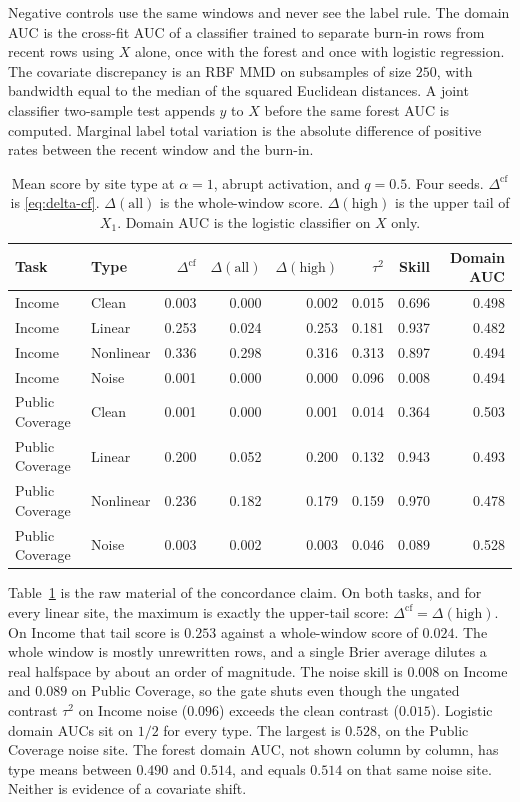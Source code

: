 Negative controls use the same windows and never see the label rule.
The domain AUC is the cross-fit AUC of a classifier trained to separate
burn-in rows from recent rows using $X$ alone, once with the forest and
once with logistic regression.
The covariate discrepancy is an RBF MMD on subsamples of size $250$, with
bandwidth equal to the median of the squared Euclidean distances.
A joint classifier two-sample test appends $y$ to $X$ before the same
forest AUC is computed.
Marginal label total variation is the absolute difference of positive rates
between the recent window and the burn-in.

\begin{table}[t]
\centering
\caption{Mean score by site type at $\alpha=1$, abrupt activation, and
$q=0.5$. Four seeds. $\Delta^{\mathrm{cf}}$ is \eqref{eq:delta-cf}.
$\Delta(\mathrm{all})$ is the whole-window score.
$\Delta(\mathrm{high})$ is the upper tail of $X_1$.
Domain AUC is the logistic classifier on $X$ only.}
\label{tab:means}
\small
\begin{tabular}{llrrrrrr}
\toprule
Task & Type & $\Delta^{\mathrm{cf}}$ & $\Delta(\mathrm{all})$ & $\Delta(\mathrm{high})$ & $\tau^2$ & Skill & Domain AUC \\
\midrule
Income & Clean & 0.003 & 0.000 & 0.002 & 0.015 & 0.696 & 0.498 \\
Income & Linear & 0.253 & 0.024 & 0.253 & 0.181 & 0.937 & 0.482 \\
Income & Nonlinear & 0.336 & 0.298 & 0.316 & 0.313 & 0.897 & 0.494 \\
Income & Noise & 0.001 & 0.000 & 0.000 & 0.096 & 0.008 & 0.494 \\
Public Coverage & Clean & 0.001 & 0.000 & 0.001 & 0.014 & 0.364 & 0.503 \\
Public Coverage & Linear & 0.200 & 0.052 & 0.200 & 0.132 & 0.943 & 0.493 \\
Public Coverage & Nonlinear & 0.236 & 0.182 & 0.179 & 0.159 & 0.970 & 0.478 \\
Public Coverage & Noise & 0.003 & 0.002 & 0.003 & 0.046 & 0.089 & 0.528 \\
\bottomrule
\end{tabular}
\end{table}

Table~\ref{tab:means} is the raw material of the concordance claim.
On both tasks, and for every linear site, the maximum is exactly the
upper-tail score: $\Delta^{\mathrm{cf}}=\Delta(\mathrm{high})$.
On Income that tail score is $0.253$ against a whole-window score of
$0.024$.
The whole window is mostly unrewritten rows, and a single Brier average
dilutes a real halfspace by about an order of magnitude.
The noise skill is $0.008$ on Income and $0.089$ on Public Coverage, so
the gate shuts even though the ungated contrast $\tau^2$ on Income noise
($0.096$) exceeds the clean contrast ($0.015$).
Logistic domain AUCs sit on $1/2$ for every type.
The largest is $0.528$, on the Public Coverage noise site.
The forest domain AUC, not shown column by column, has type means between
$0.490$ and $0.514$, and equals $0.514$ on that same noise site.
Neither is evidence of a covariate shift.

